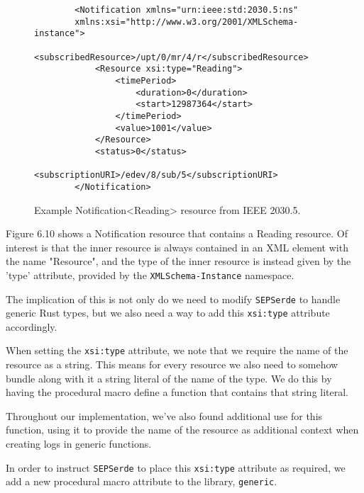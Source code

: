 \begin{figure}[H]
    \begin{center}
        \begin{lstlisting}
        <Notification xmlns="urn:ieee:std:2030.5:ns" 
        xmlns:xsi="http://www.w3.org/2001/XMLSchema-instance">
            <subscribedResource>/upt/0/mr/4/r</subscribedResource>
            <Resource xsi:type="Reading">
                <timePeriod>
                    <duration>0</duration>
                    <start>12987364</start>
                </timePeriod>
                <value>1001</value>
            </Resource>
            <status>0</status>
            <subscriptionURI>/edev/8/sub/5</subscriptionURI>
        </Notification>        
        \end{lstlisting}
        \label{fig:notifxml}
        \caption{Example Notification<Reading> resource from IEEE 2030.5.}
    \end{center}
\end{figure}

Figure 6.10 shows a Notification resource that contains a Reading resource. Of interest is that the inner resource is always contained in an XML element with the name "Resource", and the type of the inner resource is instead given by the 'type' attribute, provided by the \texttt{XMLSchema-Instance} namespace. 

The implication of this is not only do we need to modify \texttt{SEPSerde} to handle generic Rust types, but we also need a way to add this  \texttt{xsi:type} attribute accordingly.

When setting the \texttt{xsi:type} attribute, we note that we require the name of the resource as a string. This means for every resource we also need to somehow bundle along with it a string literal of the name of the type. We do this by having the procedural macro define a function that contains that string literal.

Throughout our implementation, we've also found additional use for this function, using it to provide the name of the resource as additional context when creating logs in generic functions.

In order to instruct \texttt{SEPSerde} to place this \texttt{xsi:type} attribute as required, we add a new procedural macro attribute to the library, \texttt{generic}.

